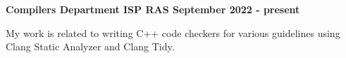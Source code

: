 \textbf{{Compilers Department ISP RAS} \hfill September 2022 - present}\par

\begin{itemize}
	My work is related to writing C++ code checkers for various guidelines using Clang Static Analyzer and Clang Tidy.
\end{itemize}\par